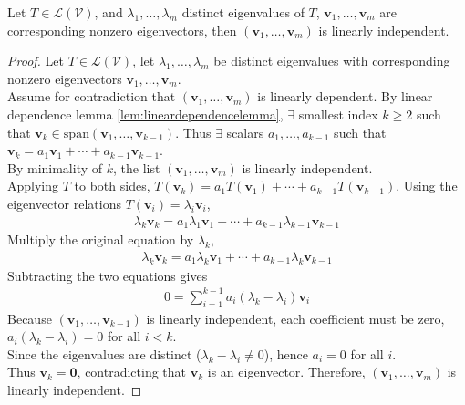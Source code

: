 \begin{theorem} \label{thm:disctingeigenvectorsindependence} Let $T \in \mathcal{L}(\mathcal{V})$, and $\lambda_1, \ldots, \lambda_m$ distinct eigenvalues of $T$, $\mathbf{v}_1, \ldots, \mathbf{v}_m$ are corresponding nonzero eigenvectors, then $(\mathbf{v}_1, \ldots, \mathbf{v}_m)$ is linearly independent.
\begin{proof} Let $T \in \mathcal{L}(\mathcal{V})$, let $\lambda_1, \ldots, \lambda_m$ be distinct eigenvalues with corresponding nonzero eigenvectors $\mathbf{v}_1, \ldots, \mathbf{v}_m$.\\
Assume for contradiction that $(\mathbf{v}_1, \ldots, \mathbf{v}_m)$ is linearly dependent. By linear dependence lemma \ref{lem:lineardependencelemma}, $\exists$ smallest index $k \geq 2$ such that $\mathbf{v}_k \in \text{span}(\mathbf{v}_1, \ldots, \mathbf{v}_{k-1})$. Thus $\exists$ scalars $a_1, \ldots, a_{k-1}$ such that $\mathbf{v}_k = a_1 \mathbf{v}_1 + \cdots + a_{k-1} \mathbf{v}_{k-1}$.\\
By minimality of $k$, the list $(\mathbf{v}_1, \ldots, \mathbf{v}_m)$  is linearly independent.\\
Applying $T$ to both sides, $T(\mathbf{v}_k) = a_1 T(\mathbf{v}_1) + \cdots + a_{k-1} T(\mathbf{v}_{k-1})$. Using the eigenvector relations $T(\mathbf{v}_i) = \lambda_i \mathbf{v}_i$,
\begin{align}
\lambda_k \mathbf{v}_k = a_1 \lambda_1 \mathbf{v}_1 + \cdots + a_{k-1} \lambda_{k-1} \mathbf{v}_{k-1} \nonumber
\end{align}
Multiply the original equation by $\lambda_k$,
\begin{align}
\lambda_k \mathbf{v}_k = a_1 \lambda_k \mathbf{v}_1 + \cdots + a_{k-1} \lambda_k \mathbf{v}_{k-1} \nonumber
\end{align}
Subtracting the two equations gives
\begin{align}
0 = \sum\limits_{i=1}^{k-1} a_i (\lambda_k - \lambda_i) \mathbf{v}_i \nonumber
\end{align}
Because $(\mathbf{v}_1, \ldots, \mathbf{v}_{k-1})$ is linearly independent, each coefficient must be zero, $a_i (\lambda_k - \lambda_i) = 0$ for all $i < k$.\\
Since the eigenvalues are distinct ($\lambda_k - \lambda_i \neq 0$), hence $a_i = 0$ for all $i$.\\
Thus $\mathbf{v}_k = \mathbf{0}$, contradicting that $\mathbf{v}_k$ is an eigenvector. Therefore, $(\mathbf{v}_1, \ldots, \mathbf{v}_m)$ is linearly independent.
\end{proof}
\end{theorem}

